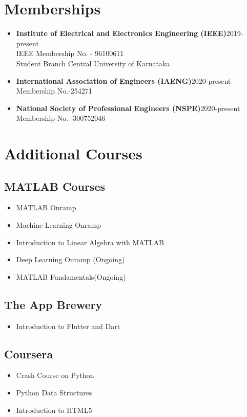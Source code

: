 \documentclass[]{article}
\begin{document}
    \section*{Memberships}
    \begin{itemize}
        \item \textbf{Institute of Electrical and Electronics Engineering (IEEE)}\hspace{2.95cm}2019-present\\ IEEE Membership No. - 96100611\\ Student Branch Central University of Karnataka
        \item \textbf{International Association of Engineers (IAENG)}\hspace{4.66cm}2020-present\\ Membership No.-254271
        \item \textbf{National Society of Professional Engineers (NSPE)}\hspace{4.186cm}2020-present\\ Membership No. -300752046
    \end{itemize}
    \section*{Additional Courses}
    \subsection*{MATLAB Courses}
    \begin{itemize}
        \item MATLAB Onramp
        \item Machine Learning Onramp
        \item Introduction to Linear Algebra with MATLAB
        \item Deep Learning Onramp (Ongoing)
        \item MATLAB Fundamentals(Ongoing)
    \end{itemize}
    \subsection*{The App Brewery}
    \begin{itemize}
        \item Introduction to Flutter and Dart
    \end{itemize}
    \subsection*{Coursera}
    \begin{itemize}
        \item Crash Course on Python
        \item Python Data Structures
        \item Introduction to HTML5
    \end{itemize}
\end{document}
